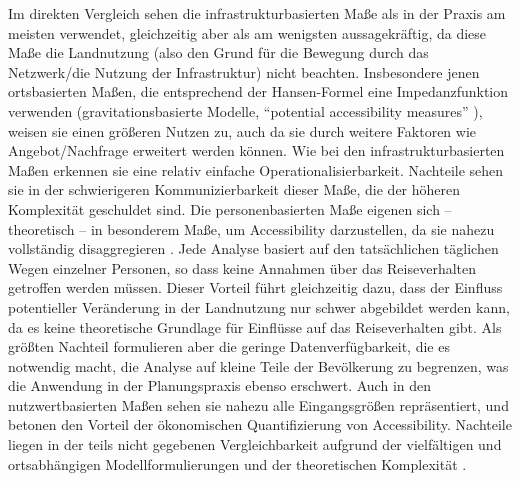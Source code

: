 \documentclass[11pt,pdftex,a4paper]{scrartcl}
\begin{document}
	Im direkten Vergleich sehen \citeauthor{geursAccessibilityEvaluationLanduse2004} die infrastrukturbasierten Maße als in der Praxis am meisten verwendet, gleichzeitig aber als am wenigsten aussagekräftig, da diese Maße die Landnutzung (also den Grund für die Bewegung durch das Netzwerk/die Nutzung der Infrastruktur) nicht beachten. Insbesondere jenen ortsbasierten Maßen, die entsprechend der Hansen-Formel eine Impedanzfunktion verwenden (gravitationsbasierte Modelle, \enquote{potential accessibility measures} \parencite[133]{geursAccessibilityEvaluationLanduse2004}), weisen sie einen größeren Nutzen zu, auch da sie durch weitere Faktoren wie Angebot/Nachfrage erweitert werden können. Wie bei den infrastrukturbasierten Maßen erkennen sie eine relativ einfache Operationalisierbarkeit. Nachteile sehen sie in der schwierigeren Kommunizierbarkeit dieser Maße, die der höheren Komplexität geschuldet sind. Die personenbasierten Maße eigenen sich -- theoretisch -- in besonderem Maße, um Accessibility darzustellen, da sie nahezu vollständig disaggregieren \parencite[134]{geursAccessibilityEvaluationLanduse2004}. Jede Analyse basiert auf den tatsächlichen täglichen Wegen einzelner Personen, so dass keine Annahmen über das Reiseverhalten getroffen werden müssen. Dieser Vorteil führt gleichzeitig dazu, dass der Einfluss potentieller Veränderung in der Landnutzung nur schwer abgebildet werden kann, da es keine theoretische Grundlage für Einflüsse auf das Reiseverhalten gibt. Als größten Nachteil formulieren \citeauthor{geursAccessibilityEvaluationLanduse2004} aber die geringe Datenverfügbarkeit, die es notwendig macht, die Analyse auf kleine Teile der Bevölkerung zu begrenzen, was die Anwendung in der Planungspraxis ebenso erschwert. Auch in den nutzwertbasierten Maßen sehen sie nahezu alle Eingangsgrößen repräsentiert, und betonen den Vorteil der ökonomischen Quantifizierung von Accessibility. Nachteile liegen in der teils nicht gegebenen Vergleichbarkeit aufgrund der vielfältigen und ortsabhängigen Modellformulierungen und der theoretischen Komplexität \parencite[136]{geursAccessibilityEvaluationLanduse2004}.
	
\end{document}
